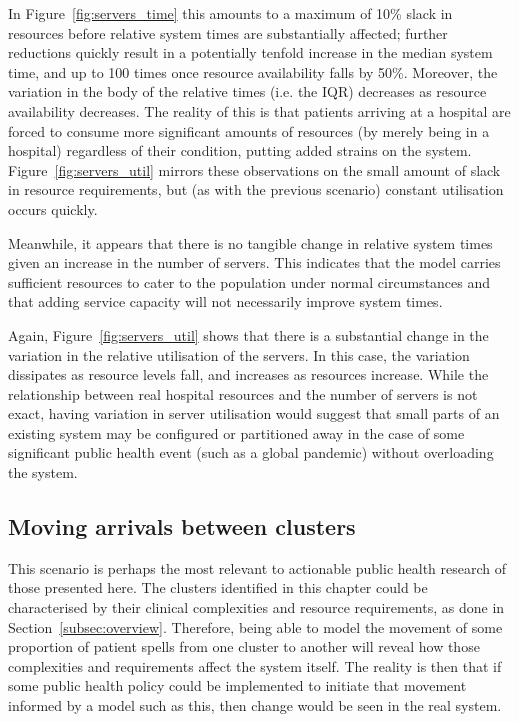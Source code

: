 In Figure~\ref{fig:servers_time} this amounts to a maximum of 10\% slack in
resources before relative system times are substantially affected; further
reductions quickly result in a potentially tenfold increase in the median system
time, and up to 100 times once resource availability falls by 50\%. Moreover,
the variation in the body of the relative times (i.e. the IQR) decreases as
resource availability decreases. The reality of this is that patients arriving
at a hospital are forced to consume more significant amounts of resources (by
merely being in a hospital) regardless of their condition, putting added strains
on the system. Figure~\ref{fig:servers_util} mirrors these observations on the
small amount of slack in resource requirements, but (as with the previous
scenario) constant utilisation occurs quickly.

Meanwhile, it appears that there is no tangible change in relative system times
given an increase in the number of servers. This indicates that the model
carries sufficient resources to cater to the population under normal
circumstances and that adding service capacity will not necessarily improve
system times.

Again, Figure~\ref{fig:servers_util} shows that there is a substantial change in
the variation in the relative utilisation of the servers. In this case, the
variation dissipates as resource levels fall, and increases as resources
increase. While the relationship between real hospital resources and the number
of servers is not exact, having variation in server utilisation would suggest
that small parts of an existing system may be configured or partitioned away in
the case of some significant public health event (such as a global pandemic)
without overloading the system.


\subsection{Moving arrivals between clusters}\label{subsec:moving}

This scenario is perhaps the most relevant to actionable public health research
of those presented here. The clusters identified in this chapter could be
characterised by their clinical complexities and resource requirements, as done
in Section~\ref{subsec:overview}. Therefore, being able to model the movement of
some proportion of patient spells from one cluster to another will reveal how
those complexities and requirements affect the system itself. The reality is
then that if some public health policy could be implemented to initiate that
movement informed by a model such as this, then change would be seen in the real
system.

